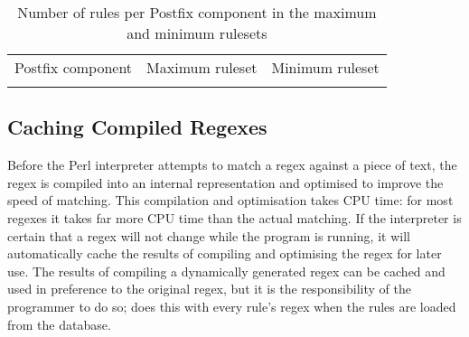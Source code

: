 

\begin{table}[thbp]
    \caption{Number of rules per Postfix component in the maximum and
    minimum rulesets}
    \empty{}\label{Number of rules per Postfix component in the maximum and
    minimum rulesets}
    \centering{}
    \begin{tabular}{lrr}
        \tabletopline{}%
        Postfix component & Maximum ruleset & Minimum ruleset \\
        \tablemiddleline{}%
        
        \tablebottomline{}%
    \end{tabular}
\end{table}

\FloatBarrier{}

\subsection{Caching Compiled Regexes}

\label{Caching compiled regexes}

Before the Perl interpreter attempts to match a regex against a piece of
text, the regex is compiled into an internal representation and optimised
to improve the speed of matching.  This compilation and optimisation takes
CPU time: for most regexes it takes far more CPU time than the actual
matching.  If the interpreter is certain that a regex will not change while
the program is running, it will automatically cache the results of
compiling and optimising the regex for later use.  The results of compiling
a dynamically generated regex can be cached and used in preference to the
original regex, but it is the responsibility of the programmer to do so;
\parsername{} does this with every rule's regex when the rules are loaded
from the database.

